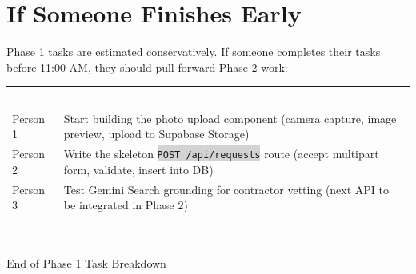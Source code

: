 \documentclass[11pt, a4paper]{article}
\newcommand{\code}[1]{\texttt{\small\colorbox{lightgray}{#1}}}
\begin{document}
\vspace{1em}

\section{If Someone Finishes Early}

Phase 1 tasks are estimated conservatively. If someone completes their tasks before 11:00 AM, they should pull forward Phase 2 work:

\begin{tabularx}{\textwidth}{|l|X|}
\hline
\rowcolor{primary}
\textcolor{white}{\textbf{Person}} & \textcolor{white}{\textbf{Pull-Forward Task}} \\
\hline
Person 1 & Start building the photo upload component (camera capture, image preview, upload to Supabase Storage) \\
\hline
Person 2 & Write the skeleton \code{POST /api/requests} route (accept multipart form, validate, insert into DB) \\
\hline
Person 3 & Test Gemini Search grounding for contractor vetting (next API to be integrated in Phase 2) \\
\hline
\end{tabularx}

\vspace{2em}

\begin{center}
\textcolor{textmuted}{\rule{0.4\textwidth}{0.4pt}}\\[6pt]
\textcolor{textmuted}{\small End of Phase 1 Task Breakdown}
\end{center}
\end{document}

